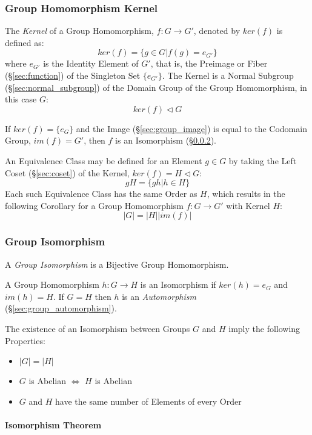 \subsubsection{Group Homomorphism Kernel}\label{sec:group_kernel}

The \emph{Kernel} of a Group Homomorphism, $f : G \rightarrow G'$,
denoted by $ker(f)$ is defined as:
\[
    ker(f) = \{g \in G | f(g) = e_{G'}\}
\]
where $e_{G'}$ is the Identity Element of $G'$, that is, the Preimage
or Fiber (\S\ref{sec:function}) of the Singleton Set $\{e_{G'}\}$.
The Kernel is a Normal Subgroup (\S\ref{sec:normal_subgroup}) of the
Domain Group of the Group Homomorphism, in this case $G$:
\[
    ker(f) \triangleleft G
\]

If $ker(f) = \{e_G\}$ and the Image (\S\ref{sec:group_image}) is equal
to the Codomain Group, $im(f) = G'$, then $f$ is an Isomorphism
(\S\ref{sec:group_isomorphism}).

An Equivalence Class may be defined for an Element $g \in G$ by taking
the Left Coset (\S\ref{sec:coset}) of the Kernel, $ker(f) = H
\triangleleft G$:
\[
    gH = \{ gh | h \in H \}
\]
Each such Equivalence Class has the same Order as $H$, which results
in the following Corollary for a Group Homomorphism $f : G \rightarrow
G'$ with Kernel $H$:
\[
    |G| = |H||im(f)|
\]



\subsubsection{Group Isomorphism}\label{sec:group_isomorphism}

A \emph{Group Isomorphism} is a Bijective Group Homomorphism.

A Group Homomorphism $h : G \rightarrow H$ is an Isomorphism if
$ker(h) = e_G$ and $im(h) = H$. If $G = H$ then $h$ is an
\emph{Automorphism} (\S\ref{sec:group_automorphism}).

The existence of an Isomorphism between Groups $G$ and $H$ imply the
following Properties:
\begin{itemize}
    \item $|G| = |H|$
    \item $G$ is Abelian $\Leftrightarrow$ $H$ is Abelian
    \item $G$ and $H$ have the same number of Elements of every Order
\end{itemize}



\paragraph{Isomorphism Theorem}\label{sec:isomorphism_theorem}

